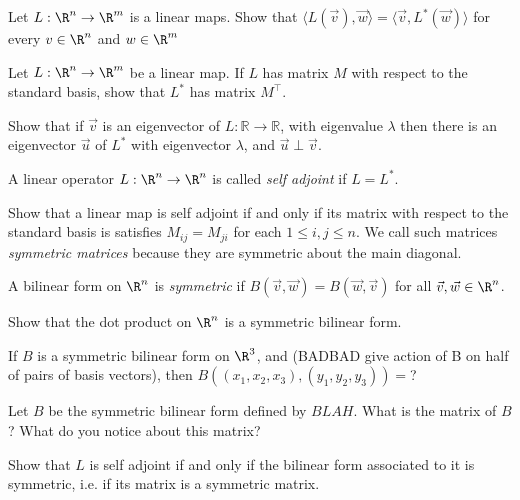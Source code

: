 		\begin{question}
			Let $L: \R^n \to \R^m$ is a linear maps.  
			Show that $\langle L(\vec{v}), \vec{w}\rangle = \langle  \vec{v},L^*(\vec{w})\rangle$ for every $v \in \R^n$ and $w \in \R^m$
		\end{question}
	
		\begin{question}
			Let $L: \R^n \to \R^m$ be a linear map.
			If $L$ has matrix $M$ with respect to the standard basis, show that $L^*$ has matrix $M^\top$.
		\end{question}
		
		\begin{question}
			Show that if $\vec{v}$ is an eigenvector of $L:\mathbb{R} \to \mathbb{R}$, with eigenvalue $\lambda$ then
			there is an eigenvector $\vec{u}$ of $L^*$ with eigenvector $\lambda$, and $\vec{u} \perp \vec{v}$. 
		\end{question}
		
		\begin{definition}
			A linear operator $L:\R^n \to \R^n$ is called \textit{self adjoint} if $L = L^*$.
		\end{definition}
		
		\begin{question}
			Show that a linear map is self adjoint if and only if its matrix with respect to the standard basis is satisfies $M_{ij} = M_{ji}$ for each $1 \leq i,j \leq n$.  We call
			such matrices \textit{symmetric matrices} because they are symmetric about the main diagonal.
		\end{question}

\begin{definition}
	A bilinear form on $\R^n$ is \textit{symmetric} if $B(\vec{v},\vec{w}) = B(\vec{w},\vec{v})$ for all $\vec{v},\vec{w} \in \R^n$.
\end{definition}

\begin{question}
	Show that the dot product on $\R^n$ is a symmetric bilinear form.
\end{question}

\begin{question}
	If $B$ is a symmetric bilinear form on $\R^3$, and (BADBAD give action of B on half of pairs of basis vectors), then $B((x_1,x_2,x_3),(y_1,y_2,y_3)) = $?
\end{question}

\begin{question}
	Let $B$ be the symmetric bilinear form defined by $BLAH$.  What is the matrix of $B$?  What do you notice about this matrix?
\end{question}

\begin{question}
	Show that $L$ is self adjoint if and only if the bilinear form associated to it is symmetric, i.e. if its matrix is a symmetric matrix.
\end{question}

